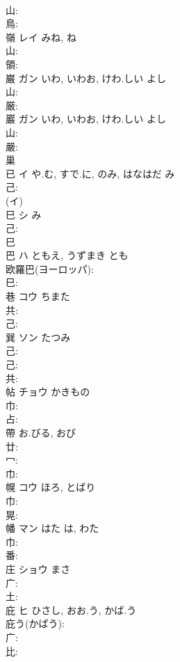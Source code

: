 \documentclass[8pt]{extreport}
\begin{document}
\begin{CJK}{UTF8}{min}
\\	山: 
\\	鳥: 
\\	嶺	レイ		みね, ね	
\\	山: 
\\	領: 
\\	巌	ガン	いわ, いわお, けわ.しい	よし	
\\	山: 
\\	厳: 
\\	巖	ガン	いわ, いわお, けわ.しい	よし	
\\	山: 
\\	嚴: 
\\	巢						
\\	已	イ	や.む, すで.に, のみ, はなはだ	み	
\\	己: 
\\	(イ)
\\	巳	シ	み		
\\	己: 
\\	巳
\\	巴	ハ	ともえ, うずまき	とも	
\\	欧羅巴(ヨーロッパ): 
\\	巳: 
\\	巷	コウ	ちまた		
\\	共: 
\\	己: 
\\	巽	ソン	たつみ		
\\	己: 
\\	己: 
\\	共: 
\\	帖	チョウ	かきもの		
\\	巾: 
\\	占: 
\\	帶		お.びる, おび				
\\	廿: 
\\	冖: 
\\	巾: 
\\	幌	コウ	ほろ, とばり		
\\	巾: 
\\	晃: 
\\	幡	マン	はた	は, わた	
\\	巾: 
\\	番: 
\\	庄	ショウ		まさ	
\\	广: 
\\	土: 
\\	庇	ヒ	ひさし, おお.う, かば.う		
\\	庇う(かばう): 
\\	广: 
\\	比: 

\end{CJK}
\end{document}
